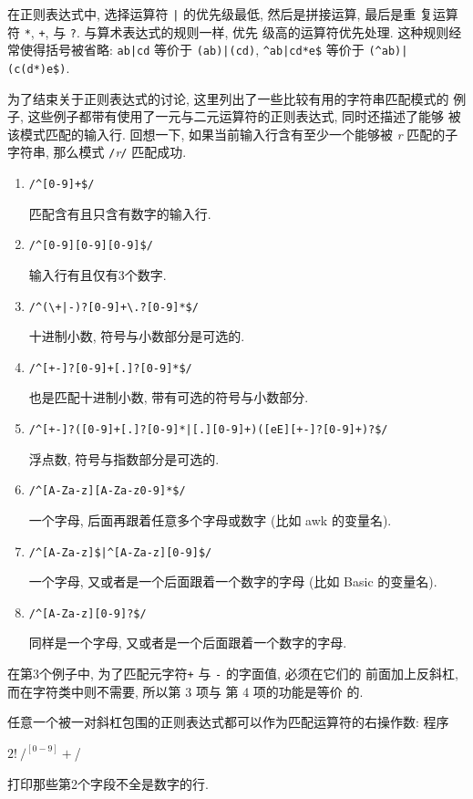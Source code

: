 在正则表达式中, 选择运算符 \verb'|' 的优先级最低, 然后是拼接运算, 最后是重
复运算符 \verb'*', \verb'+', 与 \verb'?'. 与算术表达式的规则一样, 优先
级高的运算符优先处理. 这种规则经常使得括号被省略: \verb'ab|cd' 等价于
\verb'(ab)|(cd)', \verb'^ab|cd*e$' 等价于 \verb'(^ab)|(c(d*)e$)'.

为了结束关于正则表达式的讨论, 这里列出了一些比较有用的字符串匹配模式的
例子, 这些例子都带有使用了一元与二元运算符的正则表达式, 同时还描述了能够
被该模式匹配的输入行. 回想一下, 如果当前输入行含有至少一个能够被
\textit{r} 匹配的子字符串, 那么模式 \verb'/'\textit{r}\verb'/'
匹配成功.
\begin{enumerate}
\item[] \verb'/^[0-9]+$/' \par
    \qquad 匹配含有且只含有数字的输入行.
\item[] \verb'/^[0-9][0-9][0-9]$/' \par
    \qquad 输入行有且仅有3个数字.
\item[] \verb'/^(\+|-)?[0-9]+\.?[0-9]*$/' \par
    \qquad 十进制小数, 符号与小数部分是可选的.
\item[] \verb'/^[+-]?[0-9]+[.]?[0-9]*$/' \par
    \qquad 也是匹配十进制小数, 带有可选的符号与小数部分.
\item[] \verb'/^[+-]?([0-9]+[.]?[0-9]*|[.][0-9]+)([eE][+-]?[0-9]+)?$/' \par
    \qquad 浮点数, 符号与指数部分是可选的.
\item[] \verb'/^[A-Za-z][A-Za-z0-9]*$/' \par
    \qquad 一个字母, 后面再跟着任意多个字母或数字 (比如 awk 的变量名).
\item[] \verb'/^[A-Za-z]$|^[A-Za-z][0-9]$/' \par
    \qquad 一个字母, 又或者是一个后面跟着一个数字的字母 (比如 Basic 的变量名).
\item[] \verb'/^[A-Za-z][0-9]?$/' \par
    \qquad 同样是一个字母, 又或者是一个后面跟着一个数字的字母.
\end{enumerate}
在第3个例子中, 为了匹配元字符\verb'+' 与 \verb'-' 的字面值, 必须在它们的
前面加上反斜杠, 而在字符类中则不需要, 所以第 3 项与 第 4 项的功能是等价
的.

任意一个被一对斜杠包围的正则表达式都可以作为匹配运算符的右操作数: 程序
\begin{awkcode}
    $2 !~ /^[0-9]+$/
\end{awkcode}
打印那些第2个字段不全是数字的行.

